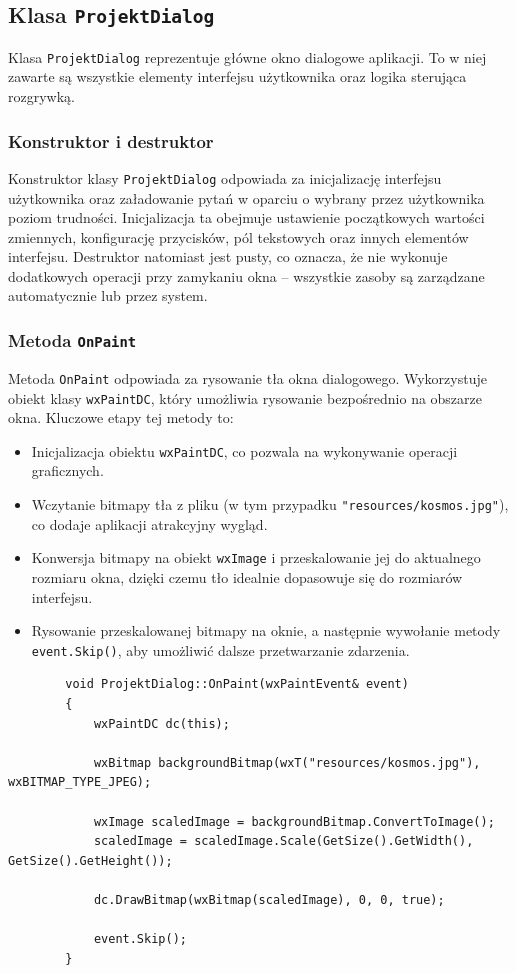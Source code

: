 \documentclass[]{article}
\begin{document}
	
	\subsection{Klasa \texttt{ProjektDialog}}
	
	Klasa \texttt{ProjektDialog} reprezentuje główne okno dialogowe aplikacji. To w niej zawarte są wszystkie elementy interfejsu użytkownika oraz logika sterująca rozgrywką.
	
	\subsubsection{Konstruktor i destruktor}
	
	Konstruktor klasy \texttt{ProjektDialog} odpowiada za inicjalizację interfejsu użytkownika oraz załadowanie pytań w oparciu o wybrany przez użytkownika poziom trudności. Inicjalizacja ta obejmuje ustawienie początkowych wartości zmiennych, konfigurację przycisków, pól tekstowych oraz innych elementów interfejsu. Destruktor natomiast jest pusty, co oznacza, że nie wykonuje dodatkowych operacji przy zamykaniu okna – wszystkie zasoby są zarządzane automatycznie lub przez system.
	
	\subsubsection{Metoda \texttt{OnPaint}}
	
	Metoda \texttt{OnPaint} odpowiada za rysowanie tła okna dialogowego. Wykorzystuje obiekt klasy \texttt{wxPaintDC}, który umożliwia rysowanie bezpośrednio na obszarze okna. Kluczowe etapy tej metody to:
	\begin{itemize}
		\item Inicjalizacja obiektu \texttt{wxPaintDC}, co pozwala na wykonywanie operacji graficznych.
		\item Wczytanie bitmapy tła z pliku (w tym przypadku \texttt{"resources/kosmos.jpg"}), co dodaje aplikacji atrakcyjny wygląd.
		\item Konwersja bitmapy na obiekt \texttt{wxImage} i przeskalowanie jej do aktualnego rozmiaru okna, dzięki czemu tło idealnie dopasowuje się do rozmiarów interfejsu.
		\item Rysowanie przeskalowanej bitmapy na oknie, a następnie wywołanie metody \texttt{event.Skip()}, aby umożliwić dalsze przetwarzanie zdarzenia.
	\end{itemize}
	
	\begin{verbatim}
		void ProjektDialog::OnPaint(wxPaintEvent& event)
		{
			wxPaintDC dc(this);
			
			wxBitmap backgroundBitmap(wxT("resources/kosmos.jpg"), wxBITMAP_TYPE_JPEG);
			
			wxImage scaledImage = backgroundBitmap.ConvertToImage();
			scaledImage = scaledImage.Scale(GetSize().GetWidth(), GetSize().GetHeight());
			
			dc.DrawBitmap(wxBitmap(scaledImage), 0, 0, true);
			
			event.Skip();
		}
	\end{verbatim}
\end{document}
